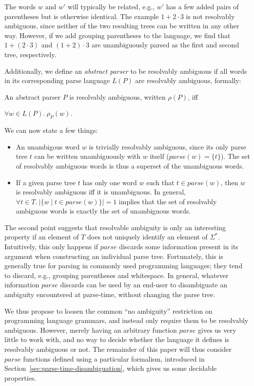 \documentclass[acmsmall,review,anonymous]{acmart}\settopmatter{printfolios=true,printccs=false,printacmref=false}
\newcommand{\T}{\Sigma} %
\newcommand{\parse}{\mathit{parse}} %
\begin{document}
The words $w$ and $w'$ will typically be related, e.g., $w'$ has a few added pairs of parentheses but is otherwise identical.
The example $1 + 2 \cdot 3$
is not resolvably ambiguous, since neither of the two resulting trees can be written in any other way. However, if we add grouping parentheses to the language, we find that $1 + (2 \cdot 3)$ and $(1 + 2) \cdot 3$ are unambiguously parsed as the first and second tree, respectively.

Additionally, we define an \emph{abstract parser} to be resolvably ambiguous if all words in its corresponding parse language $L(P)$ are resolvably ambiguous, formally:

\begin{definition}\label{def:resolvable-language}
  An abstract parser $P$ is resolvably ambiguous, written $\rho(P)$, iff

  $\forall w \in L(P).\ \rho_P(w)$.
\end{definition}

\noindent We can now state a few things:

\begin{itemize}
\item An unambigous word $w$ is trivially resolvably ambiguous, since its only parse tree $t$ can be written unambiguously with $w$ itself ($\parse(w) = \{t\}$). The set of resolvably ambiguous words is thus a superset of the unambiguous words.
\item If a given parse tree $t$ has only one word $w$ such that $t \in \parse(w)$, then $w$ is resolvably ambiguous iff it is unambiguous. In general, $\forall t \in T.\ \lvert\{w \mid t \in \parse(w)\}\rvert = 1$ implies that the set of resolvably ambiguous words is exactly the set of unambiguous words.
\end{itemize}

\noindent The second point suggests that resolvable ambiguity is only an interesting property if an element of $T$ does not uniquely identify an element of $\T^{*}$. Intuitively, this only happens if $\parse$ discards some information present in its argument when constructing an individual parse tree. Fortunately, this is generally true for parsing in commonly used programming languages; they tend to discard, e.g., grouping parentheses and whitespace. In general, whatever information $\parse$ discards can be used by an end-user to disambiguate an ambiguity encountered at parse-time, without changing the parse tree.

We thus propose to loosen the common ``no ambiguity'' restriction on programming language grammars, and instead only require them to be resolvably ambiguous. However, merely having an arbitrary function $\parse$ gives us very little to work with, and no way to decide whether the language it defines is resolvably ambiguous or not. The remainder of this paper will thus consider $\parse$ functions defined using a particular formalism, introduced in Section~\ref{sec:parse-time-disambiguation}, which gives us some decidable properties.
\end{document}
